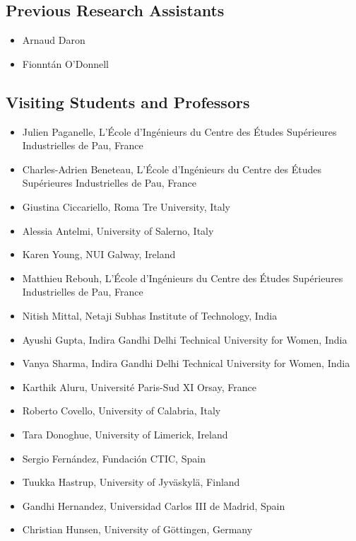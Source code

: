 \documentclass[10pt,a4paper]{res} %
\begin{document}
\begin{resume}
\subsection*{Previous Research Assistants}

\begin{itemize} \itemsep -2pt
\item Arnaud Daron
\item Fionnt\'{a}n O'Donnell
\end{itemize}

\subsection*{Visiting Students and Professors}

\begin{itemize} \itemsep -2pt
\item Julien Paganelle, L'\'{E}cole d'Ing\'{e}nieurs du Centre des \'{E}tudes Sup\'{e}rieures Industrielles de Pau, France
\item Charles-Adrien Beneteau, L'\'{E}cole d'Ing\'{e}nieurs du Centre des \'{E}tudes Sup\'{e}rieures Industrielles de Pau, France
\item Giustina Ciccariello, Roma Tre University, Italy
\item Alessia Antelmi, University of Salerno, Italy
\item Karen Young, NUI Galway, Ireland
\item Matthieu Rebouh, L'\'{E}cole d'Ing\'{e}nieurs du Centre des \'{E}tudes Sup\'{e}rieures Industrielles de Pau, France
\item Nitish Mittal, Netaji Subhas Institute of Technology, India
\item Ayushi Gupta, Indira Gandhi Delhi Technical University for Women, India
\item Vanya Sharma, Indira Gandhi Delhi Technical University for Women, India
\item Karthik Aluru, Universit\'{e} Paris-Sud XI Orsay, France
\item Roberto Covello, University of Calabria, Italy
\item Tara Donoghue, University of Limerick, Ireland
\item Sergio Fern\'{a}ndez, Fundaci\'{o}n CTIC, Spain
\item Tuukka Hastrup, University of Jyv\"{a}skyl\"{a}, Finland
\item Gandhi Hernandez, Universidad Carlos III de Madrid, Spain
\item Christian Hunsen, University of G\"{o}ttingen, Germany

\end{itemize}
\end{resume}
\end{document}
